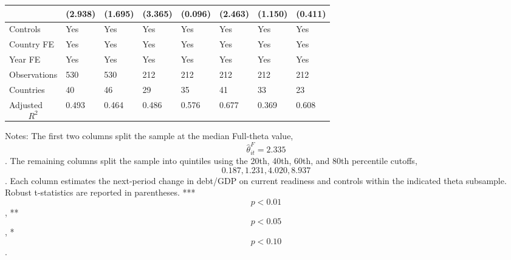\begin{table}[H]
\begin{threeparttable}
\begin{tabularx}{\textwidth}{lYYYYYYY}
  & (2.938) & (1.695) & (3.365) & (0.096) & (2.463) & (1.150) & (0.411) \\
\midrule
Controls & Yes & Yes & Yes & Yes & Yes & Yes & Yes \\
Country FE & Yes & Yes & Yes & Yes & Yes & Yes & Yes \\
Year FE & Yes & Yes & Yes & Yes & Yes & Yes & Yes \\
Observations & 530 & 530 & 212 & 212 & 212 & 212 & 212 \\
Countries & 40 & 46 & 29 & 35 & 41 & 33 & 23 \\
Adjusted $$R^2$$ & 0.493 & 0.464 & 0.486 & 0.576 & 0.677 & 0.369 & 0.608 \\
\bottomrule
\end{tabularx}
\begin{tablenotes}[flushleft]\footnotesize
\item Notes: The first two columns split the sample at the median Full-theta value, $$\widehat{\theta}^{F}_{it}=2.335$$. The remaining columns split the sample into quintiles using the 20th, 40th, 60th, and 80th percentile cutoffs, $$0.187, 1.231, 4.020, 8.937$$. Each column estimates the next-period change in debt/GDP on current readiness and controls within the indicated theta subsample. Robust t-statistics are reported in parentheses. *** $$p<0.01$$, ** $$p<0.05$$, * $$p<0.10$$.
\end{tablenotes}
\end{threeparttable}
\end{table}
